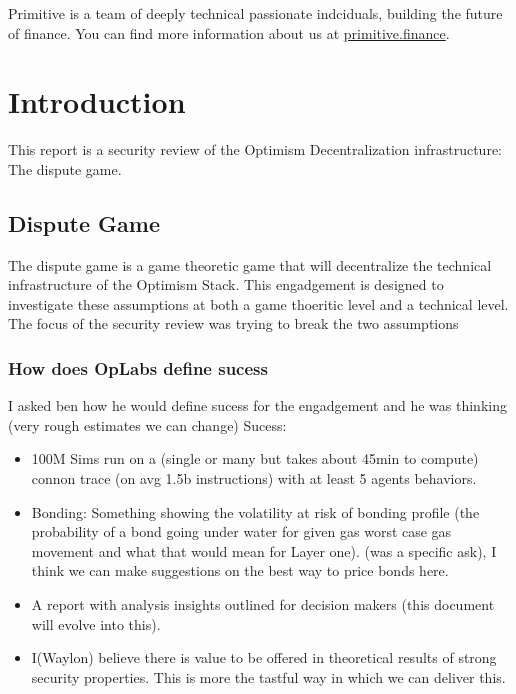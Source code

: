 \documentclass[14pt]{extarticle}
\begin{document}
Primitive is a team of deeply technical passionate indciduals, building
the future of finance.
You can find more information about us at \href{https://primitive.finance}{primitive.finance}.

\section{Introduction}\label{introduction}

This report is a security review of the Optimism Decentralization infrastructure: The dispute game.

\subsection{Dispute Game}\label{dispute-game}

The dispute game is a game theoretic game that will decentralize the technical infrastructure of the Optimism Stack.
This engadgement is designed to investigate these assumptions at both a game thoeritic level and a technical level.
The focus of the security review was trying to break the two assumptions

\subsubsection{How does OpLabs define sucess}
I asked ben how he would define sucess for the engadgement and he was thinking (very rough estimates we can change)
Sucess: 

\begin{itemize}
  \item 100M Sims run on a (single or many but takes about 45min to compute) connon trace (on avg 1.5b instructions) with at least 5 agents behaviors.
  \item Bonding: Something showing the volatility at risk of bonding profile (the probability of a bond going under water for given gas worst case gas movement and what that would mean for Layer one). (was a specific ask), I think we can make suggestions on the best way to price bonds here.
  \item A report with analysis insights outlined for decision makers (this document will evolve into this).
  \item I(Waylon) believe there is value to be offered in theoretical results of strong security properties. This is more the tastful way in which we can deliver this.
\end{itemize}
\end{document}
